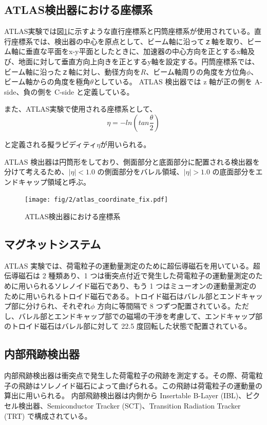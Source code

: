 \subsection{ATLAS検出器における座標系}
ATLAS実験では図\ref{fig:a}に示すような直行座標系と円筒座標系が使用されている。直行座標系では、検出器の中心を原点として、ビーム軸に沿ってｚ軸を取り、ビーム軸に垂直な平面をx-y平面としたときに、加速器の中心方向を正とするx軸及び、地面に対して垂直方向上向きを正とするy軸を設定する。円筒座標系では、ビーム軸に沿ったｚ軸に対し、動径方向を$R$、ビーム軸周りの角度を方位角$\phi$、ビーム軸からの角度を極角$\theta$としている。
ATLAS 検出器では z 軸が正の側を A-side、負の側を C-side と定義している。

また、ATLAS実験で使用される座標系として、
\begin{equation}
　\eta=-ln(tan\frac{\theta}{2})
　\label{ラピディティ}
\end{equation}

と定義される擬ラピディティ$\eta$が用いられる。

ATLAS 検出器は円筒形をしており、側面部分と底面部分に配置される検出器を分けて考えるため、$|\eta| < 1.0$ の側面部分をバレル領域、$|\eta| > 1.0$ の底面部分をエンドキャップ領域と呼ぶ。



\begin{figure}[tb]
  \centering
  \texttt{[image: fig/2/atlas\_coordinate\_fix.pdf]}
  \caption{ATLAS検出器における座標系}
  \label{fig:a}
\end{figure}

\subsection{マグネットシステム}
ATLAS 実験では、荷電粒子の運動量測定のために超伝導磁石を用いている。超伝導磁石は 2 種類あり、1 つは衝突点付近で発生した荷電粒子の運動量測定のために用いられるソレノイド磁石であり、もう 1 つはミューオンの運動量測定のために用いられるトロイド磁石である。トロイド磁石はバレル部とエンドキャップ部に分けられ、それぞれ$\phi$ 方向に等間隔で 8 つずつ配置されている。ただし、バレル部とエンドキャップ部での磁場の干渉を考慮して、エンドキャップ部のトロイド磁石はバレル部に対して 22.5 度回転した状態で配置されている。

\subsection{内部飛跡検出器}
内部飛跡検出器は衝突点で発生した荷電粒子の飛跡を測定する。その際、荷電粒子の飛跡はソレノイド磁石によって曲げられる。この飛跡は荷電粒子の運動量の算出に用いられる。
内部飛跡検出器は内側から Insertable B-Layer (IBL)、ピクセル検出器、Semiconductor Tracker (SCT)、Transition Radiation Tracker (TRT) で構成されている。


